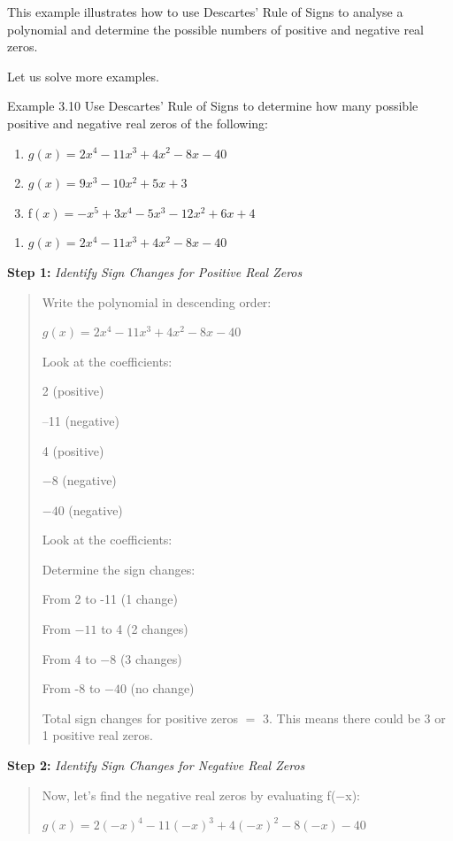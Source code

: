 This example illustrates how to use Descartes' Rule of Signs to analyse a polynomial
and determine the possible numbers of positive and negative real zeros.

Let us solve more examples.

\begin{example}{Example 3.10}
Use Descartes' Rule of Signs to determine how many possible positive and
negative real zeros of the following:
\begin{enumerate}
  \item[a.] $g(x) = 2x^4 - 11x^3 + 4x^2 - 8x - 40$
  \item[b.] $g(x) = 9x^3 - 10x^2 + 5x + 3$
  \item[c.] f$(x) = -x^5 + 3x^4 - 5x^3 - 12x^2 + 6x + 4$
\end{enumerate}

\solution
\begin{enumerate}
  \item[a.] $g(x) = 2x^4 - 11x^3 + 4x^2 - 8x - 40$
\end{enumerate}
\textbf{Step 1:} \textit{Identify Sign Changes for Positive Real Zeros}
\begin{quote}
Write the polynomial in descending order:

$g(x) = 2x^4 - 11x^3 + 4x^2 - 8x - 40$

Look at the coefficients:

2 (positive)

--11 (negative)

4 (positive)

$-8$ (negative)

$-40$ (negative)

Look at the coefficients:

Determine the sign changes:

From 2 to -11 (1 change)

From $-11$ to 4 (2 changes)

From 4 to $-8$ (3 changes)

From -8 to $-40$ (no change)

Total sign changes for positive zeros $=$ 3. This means there could be 3 or 1
positive real zeros.
\end{quote}
\textbf{Step 2:} \textit{Identify Sign Changes for Negative Real Zeros}
\begin{quote}
Now, let's find the negative real zeros by evaluating f($-$x):

$g(x) = 2(-x)^4 - 11(-x)^3 + 4(-x)^2 - 8(-x) - 40$


\end{quote}
\end{example}
